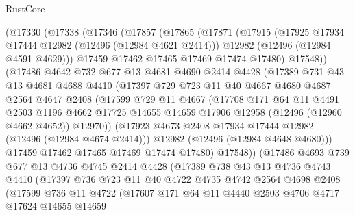\begin{lexlean}{RustCore}
\begin{coremodule}
    (@17330
      (@17338
        (@17346
          (@17857
            (@17865
              (@17871
                (@17915
                  (@17925 @17934 @17444 @12982 (@12496 (@12984 @4621 @2414)))
                  @12982
                  (@12496 (@12984 @4591 @4629)))
                @17459
                @17462
                @17465
                @17469
                @17474
                @17480)
              @17548))
          (@17486
            @4642
            @732
            @677
            @13
            @4681
            @4690
            @2414
            @4428
            (@17389
              @731
              @43
              @13
              @4681
              @4688
              @4410
              (@17397
                @729
                @723
                @11
                @40
                @4667
                @4680
                @4687
                @2564
                @4647
                @2408
                (@17599
                  @729
                  @11
                  @4667
                  (@17708
                    @171
                    @64
                    @11
                    @4491
                    @2503
                    @1196
                    @4662
                    @17725
                    @14655
                    @14659
                    @17906
                    @12958
                    (@12496 (@12960 @4662 @4652))
                    @12970))
                (@17923 @4673 @2408 @17934 @17444 @12982 (@12496 (@12984 @4674 @2414)))
                @12982
                (@12496 (@12984 @4648 @4680)))
              @17459
              @17462
              @17465
              @17469
              @17474
              @17480)
            @17548))
        (@17486
          @4693
          @739
          @677
          @13
          @4736
          @4745
          @2414
          @4428
          (@17389
            @738
            @43
            @13
            @4736
            @4743
            @4410
            (@17397
              @736
              @723
              @11
              @40
              @4722
              @4735
              @4742
              @2564
              @4698
              @2408
              (@17599
                @736
                @11
                @4722
                (@17607
                  @171
                  @64
                  @11
                  @4440
                  @2503
                  @4706
                  @4717
                  @17624
                  @14655
                  @14659

\end{coremodule}
\end{lexlean}

